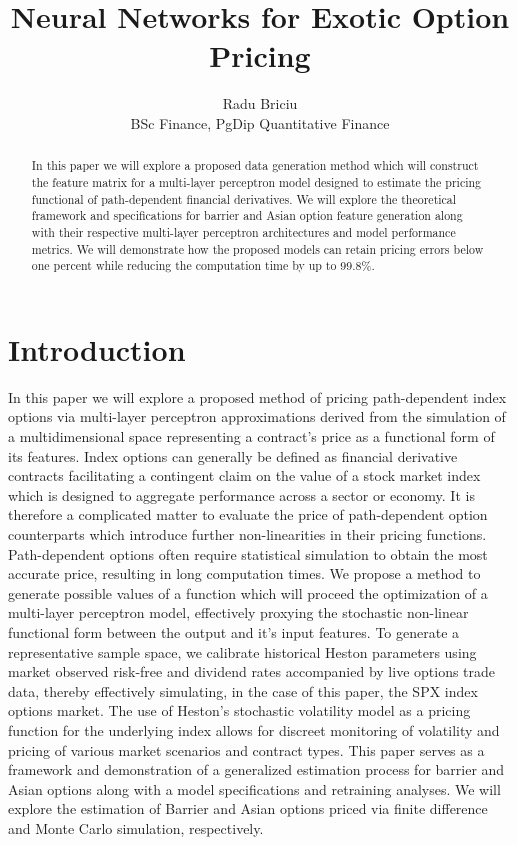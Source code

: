 \documentclass[11pt]{article}
\title{\small \textbf{Neural Networks for Exotic Option Pricing}}
\author{
	\small Radu Briciu \\ \vspace{-1em} \tiny BSc Finance, PgDip Quantitative Finance
}
\date{}
\begin{document}
\begin{titlepage}
	\maketitle
	\vspace{-1em}
	\begin{abstract}
	\noindent
	In this paper we will explore a proposed data generation method which will construct the feature matrix for a multi-layer perceptron model designed to estimate the pricing functional of path-dependent financial derivatives. We will explore the theoretical framework and specifications for barrier and Asian option feature generation along with their respective multi-layer perceptron architectures and model performance metrics. We will demonstrate how the proposed models can retain pricing errors below one percent while reducing the computation time by up to 99.8\%.
	\end{abstract}
	
	\begingroup
	\small
	\tableofcontents
	\endgroup
\end{titlepage}
\setcounter{page}{1}

\section{Introduction}
	In this paper we will explore a proposed method of pricing path-dependent index options via multi-layer perceptron approximations derived from the simulation of a multidimensional space representing a contract's price as a functional form of its features. Index options can generally be defined as financial derivative contracts facilitating a contingent claim on the value of a stock market index which is designed to aggregate performance across a sector or economy. It is therefore a complicated matter to evaluate the price of path-dependent option counterparts which introduce further non-linearities in their pricing functions. Path-dependent options often require statistical simulation to obtain the most accurate price, resulting in long computation times. We propose a method to generate possible values of a function which will proceed the optimization of a multi-layer perceptron model, effectively proxying the stochastic non-linear functional form between the output and it's input features. To generate a representative sample space, we calibrate historical Heston \cite{heston_1993_a} parameters using market observed risk-free and dividend rates accompanied by live options trade data, thereby effectively simulating, in the case of this paper, the SPX index options market. The use of Heston's \cite{heston_1993_a} stochastic volatility model as a pricing function for the underlying index allows for discreet monitoring of volatility and pricing of various market scenarios and contract types. This paper serves as a framework and demonstration of a generalized estimation process for barrier and Asian options along with a model specifications and retraining analyses. We will explore the estimation of Barrier and Asian options priced via finite difference and Monte Carlo simulation, respectively.
\end{document}
